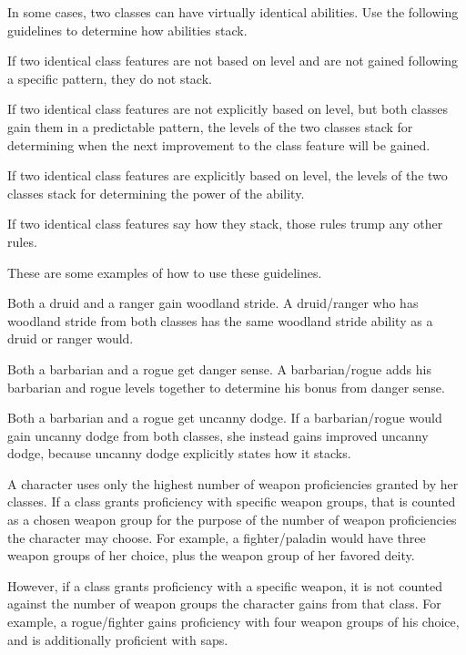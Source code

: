 \par In some cases, two classes can have virtually identical abilities.
Use the following guidelines to determine how abilities stack.
\begin{itemize*}
\item If two identical class features are not based on level and are not gained following a specific pattern, they do not stack.
\item If two identical class features are not explicitly based on level, but both classes gain them in a predictable pattern, the levels of the two classes stack for determining when the next improvement to the class feature will be gained.
\item If two identical class features are explicitly based on level, the levels of the two classes stack for determining the power of the ability.
\item If two identical class features say how they stack, those rules trump any other rules.
\end{itemize*}
These are some examples of how to use these guidelines.
\begin{itemize*}
\item Both a druid and a ranger gain woodland stride. A druid/ranger who has woodland stride from both classes has the same woodland stride ability as a druid or ranger would.
\item Both a barbarian and a rogue get danger sense. A barbarian/rogue adds his barbarian and rogue levels together to determine his bonus from danger sense.
\item Both a barbarian and a rogue get uncanny dodge. If a barbarian/rogue would gain uncanny dodge from both classes, she instead gains improved uncanny dodge, because uncanny dodge explicitly states how it stacks.
\end{itemize*}

 A character uses only the highest number of weapon proficiencies granted by her classes. If a class grants proficiency with specific weapon groups, that is counted as a chosen weapon group for the purpose of the number of weapon proficiencies the character may choose. For example, a fighter/paladin would have three weapon groups of her choice, plus the weapon group of her favored deity.

However, if a class grants proficiency with a specific weapon, it is not counted against the number of weapon groups the character gains from that class. For example, a rogue/fighter gains proficiency with four weapon groups of his choice, and is additionally proficient with saps.

